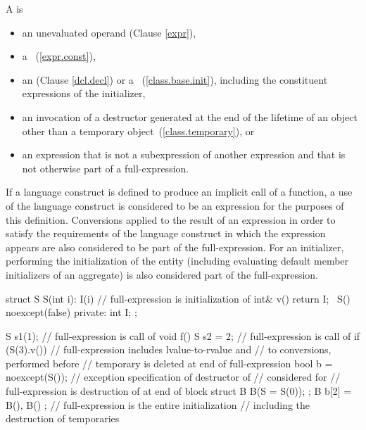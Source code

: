 \pnum
A  is

\begin{itemize}
\item
an unevaluated operand (Clause \ref{expr}),
\item
a ~(\ref{expr.const}),
\item
an  (Clause \ref{dcl.decl}) or
a ~(\ref{class.base.init}),
including the constituent expressions of the initializer,
\item
an invocation of a destructor generated at the end of the lifetime
of an object other than a temporary object~(\ref{class.temporary}), or
\item
an expression that is not a subexpression of another expression and
that is not otherwise part of a full-expression.
\end{itemize}
If a language construct is defined to produce an implicit call of a function,
a use of the language construct is considered to be an expression
for the purposes of this definition.
Conversions applied to the result of an expression in order to satisfy the requirements
of the language construct in which the expression appears
are also considered to be part of the full-expression.
For an initializer, performing the initialization of the entity
(including evaluating default member initializers of an aggregate)
is also considered part of the full-expression.
\begin{example}
\begin{codeblock}
struct S {
  S(int i): I(i) { }       // full-expression is initialization of 
  int& v() { return I; }
  ~S() noexcept(false) { }
private:
  int I;
};

S s1(1);                   // full-expression is call of 
void f() {
  S s2 = 2;                // full-expression is call of 
  if (S(3).v())            // full-expression includes lvalue-to-rvalue and
                           //  to  conversions, performed before
                           // temporary is deleted at end of full-expression
  { }
  bool b = noexcept(S());  // exception specification of destructor of 
                           // considered for 
  // full-expression is destruction of  at end of block
}
struct B {
      B(S = S(0));
   };
   B b[2] = { B(), B() };  // full-expression is the entire initialization
                           // including the destruction of temporaries
\end{codeblock}
\end{example}

